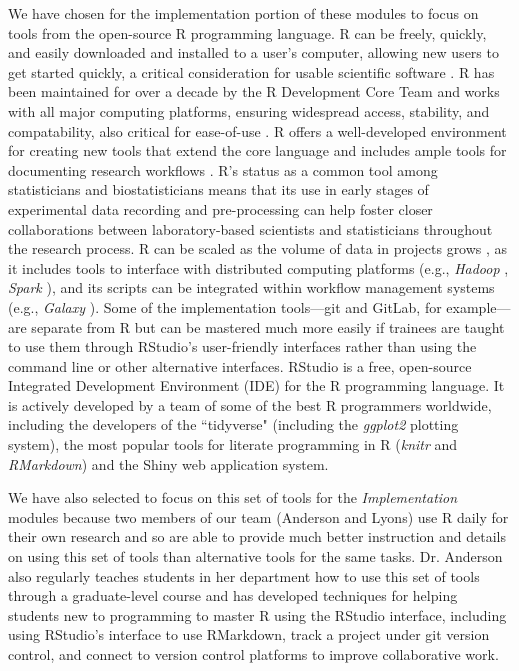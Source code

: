 \documentclass[pdftex,english,11pt,parskip=half]{scrartcl}
\begin{document}
We have chosen for the implementation portion of these
modules to focus on tools from the open-source R programming language. R can be
freely, quickly, and easily downloaded and installed to a user's computer,
allowing new users to get started quickly, a critical consideration for usable
scientific software \cite{list2017ten}. R has been maintained for over a decade
by the R Development Core Team and works with all major computing platforms,
ensuring  widespread access, stability, and compatability, also critical for
ease-of-use \cite{baumer2017lessons, altschul2013anatomy}. R offers a
well-developed environment for creating new tools that extend the core language
\cite{wickham2015r, gentleman2004bioconductor} and includes ample tools for documenting research workflows
\cite{xie2015dynamic, xie2016bookdown}. R's status as a common tool among statisticians and biostatisticians means that its use in early stages of
experimental data recording and pre-processing can help foster closer
collaborations between laboratory-based scientists and statisticians throughout
the research process. R can be scaled as the volume of data in projects grows
\cite{list2017ten}, as it includes tools to interface with distributed computing
platforms (e.g., \textit{Hadoop} \cite{pathak2014rhadoop}, \textit{Spark}
\cite{sparklyr}), and its scripts can be integrated within workflow management
systems (e.g., \textit{Galaxy} \cite{goecks2010galaxy, walker2016models}). Some
of the implementation tools---git and GitLab, for example---are separate from R
but can be mastered much more easily if trainees are taught to use them through
RStudio's user-friendly interfaces rather than using the command line or other
alternative interfaces. RStudio is a free, open-source Integrated Development Environment (IDE) for the R programming language. It is actively developed by a team of some of the best R programmers worldwide, including the developers of the ``tidyverse" (including the \textit{ggplot2} plotting system), the most popular tools for literate programming in R (\textit{knitr} and \textit{RMarkdown}) and the Shiny web application system. 

We have also selected to focus on this set of tools for
the \textit{Implementation} modules because two members of our team (Anderson
and Lyons) use R daily for their own research and so are able to provide much
better instruction and details on using this set of tools than alternative tools
for the same tasks. Dr. Anderson also regularly teaches students in her
department how to use this set of tools through a graduate-level course and has
developed techniques for helping students new to programming to master R using
the RStudio interface, including using RStudio's interface to use RMarkdown,
track a project under git version control, and connect to version control
platforms to improve collaborative work. 
\end{document}
